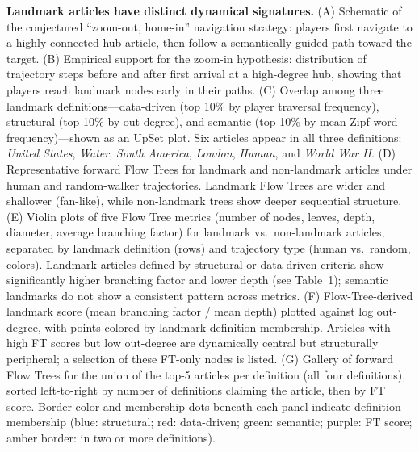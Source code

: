 
\caption{\textbf{Landmark articles have distinct dynamical signatures.}
(A) Schematic of the conjectured ``zoom-out, home-in'' navigation strategy:
players first navigate to a highly connected hub article, then follow a
semantically guided path toward the target.
(B) Empirical support for the zoom-in hypothesis: distribution of trajectory steps
before and after first arrival at a high-degree hub, showing that players reach
landmark nodes early in their paths.
(C) Overlap among three landmark definitions---data-driven (top 10\% by player
traversal frequency), structural (top 10\% by out-degree), and semantic (top 10\% by
mean Zipf word frequency)---shown as an UpSet plot.
Six articles appear in all three definitions: \textit{United States}, \textit{Water},
\textit{South America}, \textit{London}, \textit{Human}, and \textit{World War II}.
(D) Representative forward Flow Trees for landmark and non-landmark articles under
human and random-walker trajectories.
Landmark Flow Trees are wider and shallower (fan-like), while non-landmark trees
show deeper sequential structure.
(E) Violin plots of five Flow Tree metrics (number of nodes, leaves, depth, diameter,
average branching factor) for landmark vs.\ non-landmark articles, separated by
landmark definition (rows) and trajectory type (human vs.\ random, colors).
Landmark articles defined by structural or data-driven criteria show significantly
higher branching factor and lower depth (see Table~1); semantic landmarks do not
show a consistent pattern across metrics.
(F) Flow-Tree-derived landmark score (mean branching factor / mean depth) plotted
against log out-degree, with points colored by landmark-definition membership.
Articles with high FT scores but low out-degree are dynamically central but
structurally peripheral; a selection of these FT-only nodes is listed.
(G) Gallery of forward Flow Trees for the union of the top-5 articles per definition
(all four definitions), sorted left-to-right by number of definitions claiming the
article, then by FT score.
Border color and membership dots beneath each panel indicate definition membership
(blue: structural; red: data-driven; green: semantic; purple: FT score; amber
border: in two or more definitions).
}


